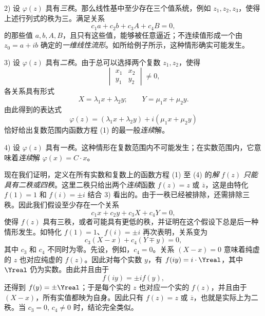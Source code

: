 2) 设 $\varphi(z)$ 具有\emph{三秩}。那么线性基中至少存在三个值系统，例如 $z_1,z_2,z_3$，使得上述行列式的秩为三。满足关系
\[
c_1a+c_2b+c_3A+c_4B=0,
\]
的那些值 $a,b,A,B$，且只有这些值，能够被任意逼近；不连续值形成一个由 $z_0=a+ib$ 确定的\emph{一维线性流形}。如所给例子所示，这种情形确实可能发生。

3) 设 $\varphi(z)$ 具有\emph{二秩}。由于总可以选择两个复数 $z_1,z_2$，使得
\[
\begin{vmatrix}x_1&x_2\\ y_1&y_2\end{vmatrix}\ne0,
\]
各关系具有形式
\[
X=\lambda_1x+\lambda_2y;\qquad Y=\mu_1x+\mu_2y.
\]
由此得到的表达式
\[
\varphi(z)=(\lambda_1x+\lambda_2y)+i(\mu_1x+\mu_2y)
\]
恰好给出复数范围内函数方程 (1) 的最一般\emph{连续}解。

4) 设 $\varphi(z)$ 具有\emph{一秩}。这种情形在复数范围内不可能发生；在实数范围内，它意味着\emph{连续}解 $\varphi(x)=C\cdot x$。

现在我们证明，定义在所有实数和复数上的函数方程 (1) 至 (4) 的\emph{解} $f(z)$ \emph{只能具有二秩或四秩}。这里二秩只给出两个\emph{连续}函数 $f(z)=z$ 或 $\overline z$，这是由特化 $f(1)=1$ 和 $f(i)=\pm i$ 结合 3) 看出的。由于一秩已经被排除，还需排除三秩。因此我们假设至少存在一个关系
\[
c_1x+c_2y+c_3X+c_4Y=0,
\]
使得 $f(z)$ 具有三秩，或者可能具有更低的秩，并证明在这个假设下总是后一种情形发生。如特化 $f(1)=1$、$f(i)=\pm i$ 再次表明，关系变为
\[
c_3(X-x)+c_4(Y\mp y)=0,
\]
其中 $c_3$ 和 $c_4$ 不同时为零。先设，例如，$c_4=0$。关系 $(X-x)=0$ 意味着纯虚的 $z$ 也对应纯虚的 $f(z)$。因此对每个实数 $y$，有 $f(iy)=i\cdot\Yreal$，其中 $\Yreal$ 仍为实数。由此并且由于
\[
f(iy)=\pm i f(y),
\]
还得到 $f(y)=\pm\Yreal$；于是每个实的 $z$ 也对应一个实的 $f(z)$，并且由于 $(X-x)$，所有实值都映为自身。因此只有 $f(z)=z$ 或 $\overline z$，也就是实际上为二秩。当 $c_3=0$, $c_4\ne0$ 时，结论完全类似。

